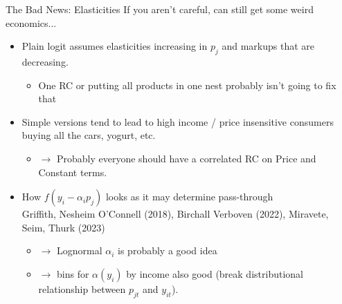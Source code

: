 \documentclass[aspectratio=169,10pt]{beamer}
\begin{document}
\begin{frame}{The Bad News: Elasticities}
If you aren't careful, can still get some weird economics...
\begin{itemize}
\item Plain logit assumes \alert{elasticities increasing in $p_j$} and \alert{markups that are decreasing}.\\
\begin{itemize}
\item One RC or putting all products in one nest probably isn't going to fix that
\end{itemize}
\item Simple versions tend to lead to \alert{high income} / \alert{price insensitive} consumers buying all the cars, yogurt, etc.
\begin{itemize}
\item $\rightarrow$ Probably everyone should have a \alert{correlated} RC on Price and Constant terms.
\end{itemize}

\item How $f(y_i - \alpha_i p_j)$ looks as it may determine \alert{pass-through}
\\
Griffith, Nesheim O'Connell (2018), Birchall Verboven (2022), Miravete, Seim, Thurk (2023)
\begin{itemize}
\item $\rightarrow$ Lognormal $\alpha_i$ is probably a good idea
\item $\rightarrow$ bins for $\alpha(y_i)$ by income also good (break distributional relationship between $p_{jt}$ and $y_{it}$).
\end{itemize}

\end{itemize}
\end{frame}
\end{document}
